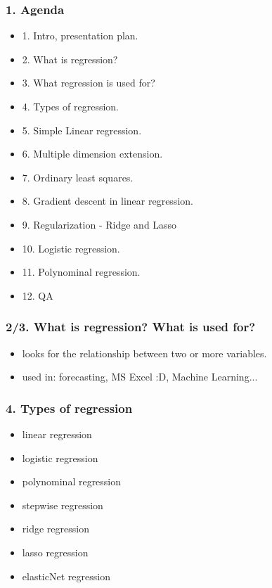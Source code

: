 \documentclass[handout,compress]{beamer} %
\begin{document}
\renewcommand{\logosinfootline}{\raisebox{0.12cm}{\begin{beamercolorbox}{rafi}{Seminar \quad Overview regression methods \hfill \insertframenumber/\inserttotalframenumber}\end{beamercolorbox}}}
\begin{frame}[allowframebreaks]
	\frametitle{1. Agenda}
    \begin{itemize}
    \item 1. Intro, presentation plan.
    \item 2. What is regression?
    \item 3. What regression is used for?
    \item 4. Types of regression.
    \item 5. Simple Linear regression.
    \item 6. Multiple dimension extension.
    \item 7. Ordinary least squares.
    \item 8. Gradient descent in linear regression.
    \item 9. Regularization - Ridge and Lasso
    \item 10. Logistic regression.
    \item 11. Polynominal regression.
    \item 12. QA
	\end{itemize}
\end{frame}
\begin{frame}
	\frametitle{2/3. What is regression? What is used for?}
	\begin{itemize}
	\item looks for the relationship between two or more variables.
	\item used in: forecasting, MS Excel :D, Machine Learning...
\end{itemize}		
\end{frame}
\begin{frame}
	\frametitle{4. Types of regression}
	\begin{itemize}
	\item linear regression
	\item logistic regression
	\item polynominal regression
	\item stepwise regression
	\item ridge regression
	\item lasso regression
	\item elasticNet regression
\end{itemize}		
\end{frame}
\end{document}
